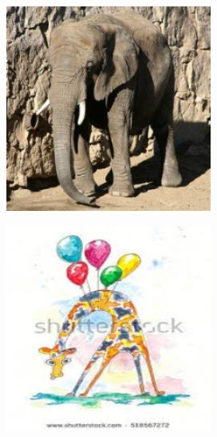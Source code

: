\documentclass{article}
\begin{document}
\begin{center}
\begin{minipage}{0.142\textwidth}
    \end{minipage}%
    \begin{minipage}{0.142\textwidth}
        \includegraphics[width=\linewidth]{./pic/misclassified_r1_p2_2723.jpg}
    \end{minipage}%
    \begin{minipage}{0.142\textwidth}
        \includegraphics[width=\linewidth]{./pic/misclassified_r2_p3_2723.jpg}

\end{minipage}
\end{center}
\end{document}
